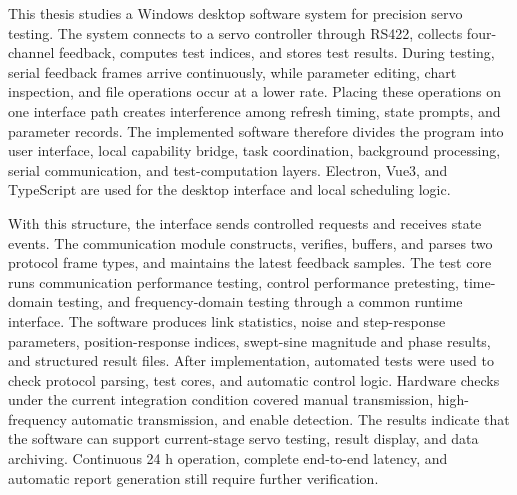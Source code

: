 \begin{abstractEn}
This thesis studies a Windows desktop software system for precision servo testing. The system connects to a servo controller through RS422, collects four-channel feedback, computes test indices, and stores test results. During testing, serial feedback frames arrive continuously, while parameter editing, chart inspection, and file operations occur at a lower rate. Placing these operations on one interface path creates interference among refresh timing, state prompts, and parameter records. The implemented software therefore divides the program into user interface, local capability bridge, task coordination, background processing, serial communication, and test-computation layers. Electron, Vue3, and TypeScript are used for the desktop interface and local scheduling logic.

With this structure, the interface sends controlled requests and receives state events. The communication module constructs, verifies, buffers, and parses two protocol frame types, and maintains the latest feedback samples. The test core runs communication performance testing, control performance pretesting, time-domain testing, and frequency-domain testing through a common runtime interface. The software produces link statistics, noise and step-response parameters, position-response indices, swept-sine magnitude and phase results, and structured result files. After implementation, automated tests were used to check protocol parsing, test cores, and automatic control logic. Hardware checks under the current integration condition covered manual transmission, high-frequency automatic transmission, and enable detection. The results indicate that the software can support current-stage servo testing, result display, and data archiving. Continuous 24 h operation, complete end-to-end latency, and automatic report generation still require further verification.
\end{abstractEn}

\usepackage{subfig}
\usepackage{rotating}
\usepackage[usenames,dvipsnames]{xcolor}
\usepackage{tikz}
\usetikzlibrary{shapes.geometric}
\usepackage{pgfplots}
\pgfplotsset{compat=1.16}
\usepackage{ifthen}
\usepackage{longtable}
\usepackage{float}
\usepackage{placeins}
\usepackage{siunitx}
\usepackage{listings}
\usepackage{multirow}
\usepackage{pifont}
\usepackage{collcell}

